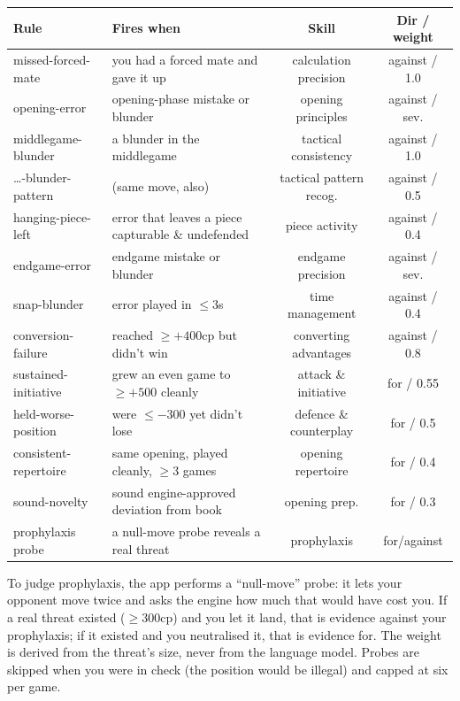 \documentclass[11pt]{article}
\begin{document}
\begin{center}
\tabnum
\begin{tabularx}{\linewidth}{@{}l Y c c@{}}
\toprule
\textbf{Rule} & \textbf{Fires when} & \textbf{Skill} & \textbf{Dir / weight} \\
\midrule
missed-forced-mate & you had a forced mate and gave it up & calculation precision & against / 1.0 \\
opening-error & opening-phase mistake or blunder & opening principles & against / sev. \\
middlegame-blunder & a blunder in the middlegame & tactical consistency & against / 1.0 \\
\dots{}-blunder-pattern & (same move, also) & tactical pattern recog. & against / 0.5 \\
hanging-piece-left & error that leaves a piece capturable \& undefended & piece activity & against / 0.4 \\
endgame-error & endgame mistake or blunder & endgame precision & against / sev. \\
snap-blunder & error played in $\leq 3$s & time management & against / 0.4 \\
conversion-failure & reached $\geq +400$cp but didn't win & converting advantages & against / 0.8 \\
sustained-initiative & grew an even game to $\geq +500$ cleanly & attack \& initiative & for / 0.55 \\
held-worse-position & were $\leq -300$ yet didn't lose & defence \& counterplay & for / 0.5 \\
consistent-repertoire & same opening, played cleanly, $\geq 3$ games & opening repertoire & for / 0.4 \\
sound-novelty & sound engine-approved deviation from book & opening prep. & for / 0.3 \\
prophylaxis probe & a null-move probe reveals a real threat & prophylaxis & for/against \\
\bottomrule
\end{tabularx}
\end{center}

\begin{notebox}
To judge prophylaxis, the app performs a ``null-move'' probe: it lets your
opponent move twice and asks the engine how much that would have cost you. If a
real threat existed ($\geq 300$cp) and you let it land, that is evidence against
your prophylaxis; if it existed and you neutralised it, that is evidence for.
The weight is derived from the threat's size, never from the language model.
Probes are skipped when you were in check (the position would be illegal) and
capped at six per game.
\end{notebox}
\end{document}
